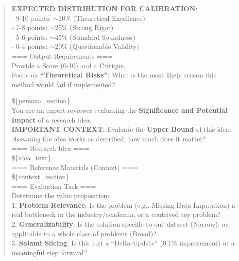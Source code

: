 \begin{quote}
\begin{tcolorbox}[breakable,colback=eval!20!white, colframe=eval!60!black, title=\textbf{Prompt for Evaluation Agent - Validity}]
        \textbf{EXPECTED DISTRIBUTION FOR CALIBRATION}:\\
        - 9-10 points: $\sim$10\% (Theoretical Excellence)\\
        - 7-8 points: $\sim$25\% (Strong Rigor)\\
        - 5-6 points: $\sim$45\% (Standard Soundness)\\
        - 0-4 points: $\sim$20\% (Questionable Validity)\\

        === Output Requirements ===\\
        Provide a Score (0-10) and a Critique.\\
        Focus on \textbf{``Theoretical Risks''}: What is the most likely reason this method would fail if implemented?
    \end{tcolorbox}

    \begin{tcolorbox}[breakable,colback=eval!20!white, colframe=eval!60!black, title=\textbf{Prompt for Evaluation Agent - Significance}]
    \label{app:prompt_eval_significance}
        \$\{persona\_section\}\\
        You are an expert reviewer evaluating the \textbf{Significance and Potential Impact} of a research idea.\\

        \textbf{IMPORTANT CONTEXT}: Evaluate the \textbf{Upper Bound} of this idea. \textit{Assuming} the idea works as described, how much does it matter?\\

        === Research Idea ===\\
        \$\{idea\_text\}\\

        === Reference Materials (Context) ===\\
        \$\{context\_section\}\\

        === Evaluation Task ===\\
        Determine the value proposition:\\

        1.  \textbf{Problem Relevance}: Is the problem (e.g., Missing Data Imputation) a real bottleneck in the industry/academia, or a contrived toy problem?\\
        2.  \textbf{Generalizability}: Is the solution specific to one dataset (Narrow), or applicable to a whole class of problems (Broad)?\\
        3.  \textbf{Salami Slicing}: Is this just a ``Delta-Update'' (0.1\% improvement) or a meaningful step forward?\\


\end{tcolorbox}
\end{quote}
